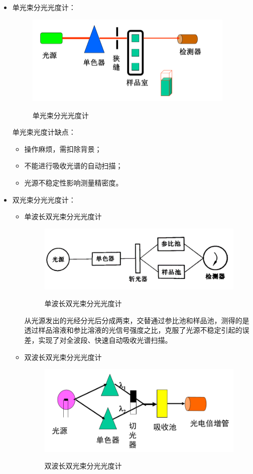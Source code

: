 \begin{itemize}
    \item 单光束分光光度计：
    \begin{figure}[h]
        \centering
        \includegraphics[width=10cm]{image/chp3_single_beam.png}
        \label{fig:chp3singlebeam}
        \caption{单光束分光光度计}
    \end{figure}
    \begin{note}
        单光束光度计缺点：
        \begin{itemize}
    \item  操作麻烦，需扣除背景；
    \item  不能进行吸收光谱的自动扫描；
    \item  光源不稳定性影响测量精密度。
\end{itemize}
    \end{note}
    \item 双光束分光光度计：
    \begin{itemize}
        \item  单波长双光束分光光度计
        \begin{figure}[h]
            \centering
            \includegraphics[width=10cm]{image/chp3_single_wl.png}
            \label{fig:chp3singlewl}
            \caption{单波长双光束分光光度计}
        \end{figure}
        
        从光源发出的光经分光后分成两束，交替通过参比池和样品池，测得的是透过样品溶液和参比溶液的光信号强度之比，克服了光源不稳定引起的误差，实现了对全波段、快速自动吸收光谱扫描。
        \item 双波长双光束分光光度计
        \begin{figure}[h]
            \centering
            \includegraphics[width=10cm]{image/chp3_double_wl.png}
            \label{fig:chp3doublewl}
            \caption{双波长双光束分光光度计}
        \end{figure}
        

\end{itemize}
\end{itemize}
